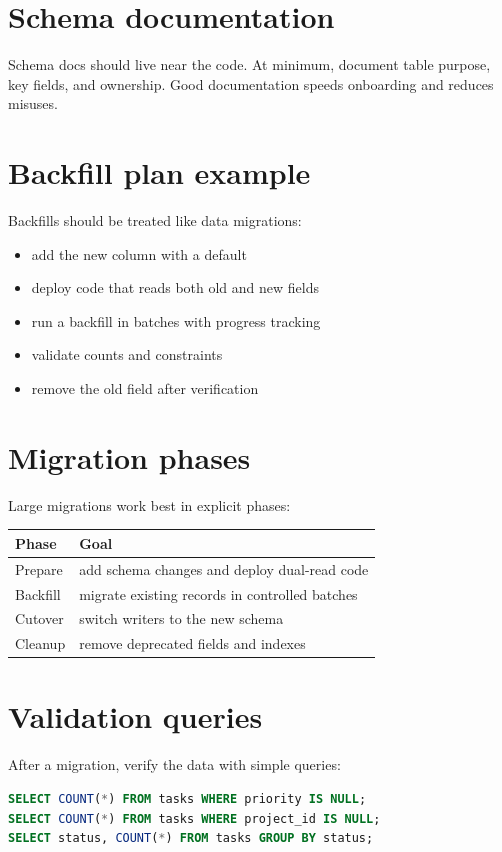 \section{Schema documentation}
Schema docs should live near the code.
At minimum, document table purpose, key fields, and ownership.
Good documentation speeds onboarding and reduces misuses.

\section{Backfill plan example}
Backfills should be treated like data migrations:
\begin{itemize}[nosep]
  \item add the new column with a default
  \item deploy code that reads both old and new fields
  \item run a backfill in batches with progress tracking
  \item validate counts and constraints
  \item remove the old field after verification
\end{itemize}

\section{Migration phases}
Large migrations work best in explicit phases:

\begin{tabularx}{\textwidth}{@{}lX@{}}
\toprule
Phase & Goal \\
\midrule
Prepare & add schema changes and deploy dual-read code \\
Backfill & migrate existing records in controlled batches \\
Cutover & switch writers to the new schema \\
Cleanup & remove deprecated fields and indexes \\
\bottomrule
\end{tabularx}

\section{Validation queries}
After a migration, verify the data with simple queries:
\begin{lstlisting}[language=SQL]
SELECT COUNT(*) FROM tasks WHERE priority IS NULL;
SELECT COUNT(*) FROM tasks WHERE project_id IS NULL;
SELECT status, COUNT(*) FROM tasks GROUP BY status;
\end{lstlisting}

